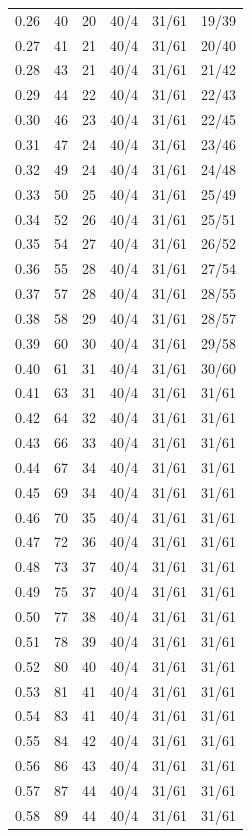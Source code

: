 \documentclass[11pt,a4paper]{article}
\begin{document}
\begin{longtable}{rrrrrr}
0.26 & 40 & 20 & 40/4 & 31/61 & 19/39 \\
0.27 & 41 & 21 & 40/4 & 31/61 & 20/40 \\
0.28 & 43 & 21 & 40/4 & 31/61 & 21/42 \\
0.29 & 44 & 22 & 40/4 & 31/61 & 22/43 \\
0.30 & 46 & 23 & 40/4 & 31/61 & 22/45 \\
0.31 & 47 & 24 & 40/4 & 31/61 & 23/46 \\
0.32 & 49 & 24 & 40/4 & 31/61 & 24/48 \\
0.33 & 50 & 25 & 40/4 & 31/61 & 25/49 \\
0.34 & 52 & 26 & 40/4 & 31/61 & 25/51 \\
0.35 & 54 & 27 & 40/4 & 31/61 & 26/52 \\
0.36 & 55 & 28 & 40/4 & 31/61 & 27/54 \\
0.37 & 57 & 28 & 40/4 & 31/61 & 28/55 \\
0.38 & 58 & 29 & 40/4 & 31/61 & 28/57 \\
0.39 & 60 & 30 & 40/4 & 31/61 & 29/58 \\
0.40 & 61 & 31 & 40/4 & 31/61 & 30/60 \\
0.41 & 63 & 31 & 40/4 & 31/61 & 31/61 \\
0.42 & 64 & 32 & 40/4 & 31/61 & 31/61 \\
0.43 & 66 & 33 & 40/4 & 31/61 & 31/61 \\
0.44 & 67 & 34 & 40/4 & 31/61 & 31/61 \\
0.45 & 69 & 34 & 40/4 & 31/61 & 31/61 \\
0.46 & 70 & 35 & 40/4 & 31/61 & 31/61 \\
0.47 & 72 & 36 & 40/4 & 31/61 & 31/61 \\
0.48 & 73 & 37 & 40/4 & 31/61 & 31/61 \\
0.49 & 75 & 37 & 40/4 & 31/61 & 31/61 \\
0.50 & 77 & 38 & 40/4 & 31/61 & 31/61 \\
0.51 & 78 & 39 & 40/4 & 31/61 & 31/61 \\
0.52 & 80 & 40 & 40/4 & 31/61 & 31/61 \\
0.53 & 81 & 41 & 40/4 & 31/61 & 31/61 \\
0.54 & 83 & 41 & 40/4 & 31/61 & 31/61 \\
0.55 & 84 & 42 & 40/4 & 31/61 & 31/61 \\
0.56 & 86 & 43 & 40/4 & 31/61 & 31/61 \\
0.57 & 87 & 44 & 40/4 & 31/61 & 31/61 \\
0.58 & 89 & 44 & 40/4 & 31/61 & 31/61 \\

\end{longtable}
\end{document}
